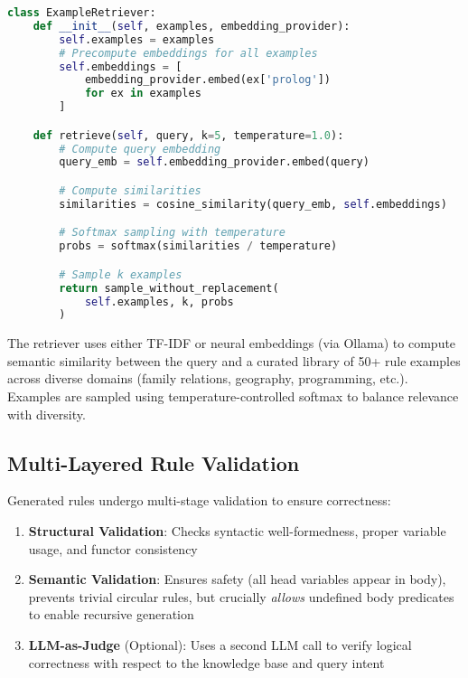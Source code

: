 \documentclass[10pt,conference]{IEEEtran}
\begin{document}
\begin{lstlisting}[language=Python]
class ExampleRetriever:
    def __init__(self, examples, embedding_provider):
        self.examples = examples
        # Precompute embeddings for all examples
        self.embeddings = [
            embedding_provider.embed(ex['prolog'])
            for ex in examples
        ]

    def retrieve(self, query, k=5, temperature=1.0):
        # Compute query embedding
        query_emb = self.embedding_provider.embed(query)

        # Compute similarities
        similarities = cosine_similarity(query_emb, self.embeddings)

        # Softmax sampling with temperature
        probs = softmax(similarities / temperature)

        # Sample k examples
        return sample_without_replacement(
            self.examples, k, probs
        )
\end{lstlisting}

The retriever uses either TF-IDF or neural embeddings (via Ollama) to compute semantic similarity between the query and a curated library of 50+ rule examples across diverse domains (family relations, geography, programming, etc.). Examples are sampled using temperature-controlled softmax to balance relevance with diversity.

\subsection{Multi-Layered Rule Validation}

Generated rules undergo multi-stage validation to ensure correctness:

\begin{enumerate}
\item \textbf{Structural Validation}: Checks syntactic well-formedness, proper variable usage, and functor consistency
\item \textbf{Semantic Validation}: Ensures safety (all head variables appear in body), prevents trivial circular rules, but crucially \textit{allows} undefined body predicates to enable recursive generation
\item \textbf{LLM-as-Judge} (Optional): Uses a second LLM call to verify logical correctness with respect to the knowledge base and query intent
\end{enumerate}
\end{document}
